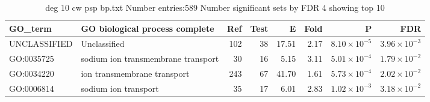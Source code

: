 \begin{table}[ht]
\centering
\begin{tabular}{llrrrrrr}
  \hline
GO\_term & GO biological process complete & Ref & Test & E & Fold & P & FDR \\ 
  \hline
UNCLASSIFIED & Unclassified  & 102 & 38 & 17.51 & 2.17 & $8.10 \times 10^{-5}$ & $3.96 \times 10^{-3}$ \\ 
  GO:0035725 & sodium ion transmembrane transport  & 30 & 16 & 5.15 & 3.11 & $5.01 \times 10^{-4}$ & $1.79 \times 10^{-2}$ \\ 
  GO:0034220 & ion transmembrane transport  & 243 & 67 & 41.70 & 1.61 & $5.73 \times 10^{-4}$ & $2.02 \times 10^{-2}$ \\ 
  GO:0006814 & sodium ion transport  & 35 & 17 & 6.01 & 2.83 & $1.02 \times 10^{-3}$ & $3.18 \times 10^{-2}$ \\ 
  \hline
\end{tabular}
\caption{deg 10 cw psp bp.txt Number entries:589 Number significant sets by FDR 4 showing top 10} 
\label{tab:deg 10 cw psp bp.txt Number entries:589 Number significant sets by FDR 4 showing top 10}
\end{table}

